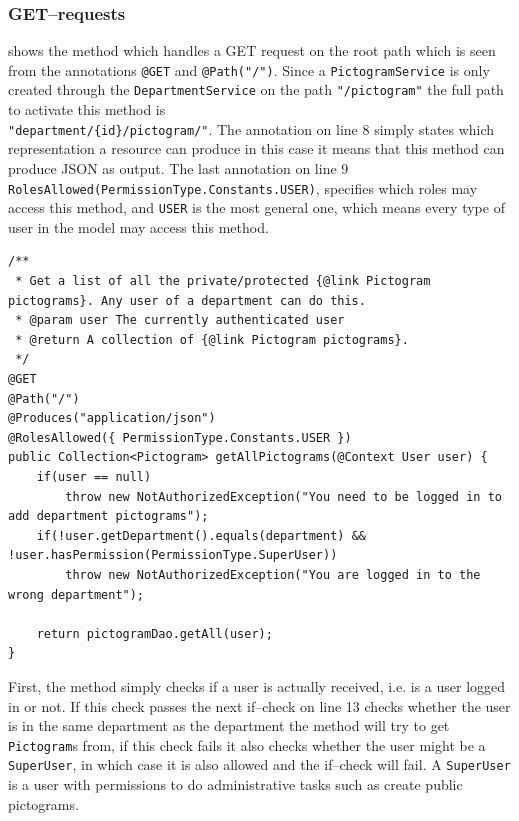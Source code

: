 \subsubsection*{GET--requests}
 shows the method which handles a GET request on the root path which is seen from the annotations \texttt{@GET} and \texttt{@Path("/")}.
Since a \texttt{PictogramService} is only created through the \texttt{DepartmentService} on the path \texttt{"/pictogram"} the full path to activate this method is \\ \texttt{"department/\{id\}/pictogram/"}.
The annotation on line 8 simply states which representation a resource can produce in this case it means that this method can produce JSON as output.
The last annotation on line 9 \texttt{RolesAllowed({PermissionType.Constants.USER})}, specifies which roles may access this method, and \texttt{USER} is the most general one, which means every type of user in the model may access this method.

\begin{lstlisting}[float, floatplacement=h, caption={A GET request to get all pictograms for a department.},label={lst:getallPictograms}]
/**
 * Get a list of all the private/protected {@link Pictogram pictograms}. Any user of a department can do this.
 * @param user The currently authenticated user
 * @return A collection of {@link Pictogram pictograms}.
 */
@GET
@Path("/")
@Produces("application/json")
@RolesAllowed({ PermissionType.Constants.USER })
public Collection<Pictogram> getAllPictograms(@Context User user) {
    if(user == null)
        throw new NotAuthorizedException("You need to be logged in to add department pictograms");
    if(!user.getDepartment().equals(department) && !user.hasPermission(PermissionType.SuperUser))
        throw new NotAuthorizedException("You are logged in to the wrong department");

    return pictogramDao.getAll(user);
}
\end{lstlisting}

First, the method simply checks if a user is actually received, i.e. is a user logged in or not.
If this check passes the next if--check on line 13 checks whether the user is in the same department as the department the method will try to get \texttt{Pictogram}s from, if this check fails it also checks whether the user might be a \texttt{SuperUser},  in which case it is also allowed and the if--check will fail.
A \texttt{SuperUser} is a user with permissions to do administrative tasks such as create public pictograms.

